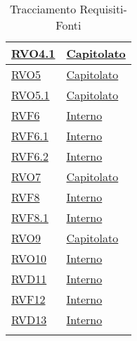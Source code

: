 \begin{longtable}{|>{\centering}m{5cm}|m{5cm}<{\centering}|}
\hyperlink{RVO4.1}{RVO4.1} & \hyperlink{Capitolato}{Capitolato}\\ \hline

\hyperlink{RVO5}{RVO5} & \hyperlink{Capitolato}{Capitolato}\\ \hline

\hyperlink{RVO5.1}{RVO5.1} & \hyperlink{Capitolato}{Capitolato}\\ \hline

\hyperlink{RVF6}{RVF6} & \hyperlink{Interno}{Interno}\\ \hline

\hyperlink{RVF6.1}{RVF6.1} & \hyperlink{Interno}{Interno}\\ \hline

\hyperlink{RVF6.2}{RVF6.2} & \hyperlink{Interno}{Interno}\\ \hline

\hyperlink{RVO7}{RVO7} & \hyperlink{Capitolato}{Capitolato}\\ \hline

\hyperlink{RVF8}{RVF8} & \hyperlink{Interno}{Interno}\\ \hline

\hyperlink{RVF8.1}{RVF8.1} & \hyperlink{Interno}{Interno}\\ \hline

\hyperlink{RVO9}{RVO9} & \hyperlink{Capitolato}{Capitolato}\\ \hline

\hyperlink{RVO10}{RVO10} & \hyperlink{Interno}{Interno}\\ \hline

\hyperlink{RVD11}{RVD11} & \hyperlink{Interno}{Interno}\\ \hline

\hyperlink{RVF12}{RVF12} & \hyperlink{Interno}{Interno}\\ \hline

\hyperlink{RVD13}{RVD13} & \hyperlink{Interno}{Interno}\\ \hline

\caption[Tracciamento Requisiti-Fonti]{Tracciamento Requisiti-Fonti}
\label{tabella:requi-fonti}
\end{longtable}
\clearpage
